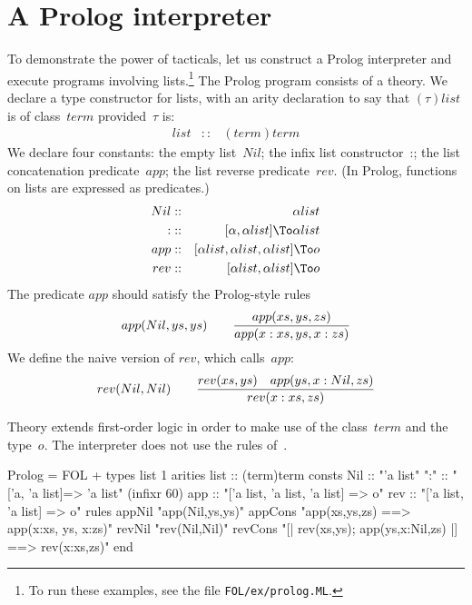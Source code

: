 \section{A Prolog interpreter}
To demonstrate the power of tacticals, let us construct a Prolog
interpreter and execute programs involving lists.\footnote{To run these
examples, see the file {\tt FOL/ex/prolog.ML}.} The Prolog program
consists of a theory.  We declare a type constructor for lists, with an
arity declaration to say that $(\tau)list$ is of class~$term$
provided~$\tau$ is:
\begin{eqnarray*}
  list  & :: & (term)term
\end{eqnarray*}
We declare four constants: the empty list~$Nil$; the infix list
constructor~{:}; the list concatenation predicate~$app$; the list reverse
predicate~$rev$.  (In Prolog, functions on lists are expressed as
predicates.)
\begin{eqnarray*}
    Nil         & :: & \alpha list \\
    {:}         & :: & [\alpha,\alpha list] \To \alpha list \\
    app & :: & [\alpha list,\alpha list,\alpha list] \To o \\
    rev & :: & [\alpha list,\alpha list] \To o 
\end{eqnarray*}
The predicate $app$ should satisfy the Prolog-style rules
\[ {app(Nil,ys,ys)} \qquad
   {app(xs,ys,zs) \over app(x:xs, ys, x:zs)} \]
We define the naive version of $rev$, which calls~$app$:
\[ {rev(Nil,Nil)} \qquad
   {rev(xs,ys)\quad  app(ys, x:Nil, zs) \over
    rev(x:xs, zs)} 
\]

Theory  extends first-order logic in order to make use
of the class~$term$ and the type~$o$.  The interpreter does not use the
rules of~.
\begin{ttbox}
Prolog = FOL +
types   list 1
arities list    :: (term)term
consts  Nil     :: "'a list"
        ":"     :: "['a, 'a list]=> 'a list"            (infixr 60)
        app     :: "['a list, 'a list, 'a list] => o"
        rev     :: "['a list, 'a list] => o"
rules   appNil  "app(Nil,ys,ys)"
        appCons "app(xs,ys,zs) ==> app(x:xs, ys, x:zs)"
        revNil  "rev(Nil,Nil)"
        revCons "[| rev(xs,ys); app(ys,x:Nil,zs) |] ==> rev(x:xs,zs)"
end
\end{ttbox}
